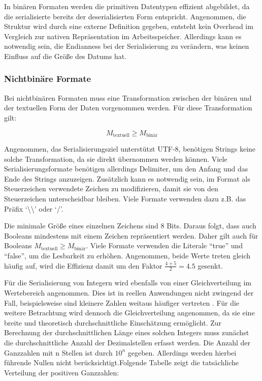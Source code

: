 \documentclass[ngerman]{seminarvorlage}
\begin{document}
In binären Formaten werden die primitiven Datentypen effizient abgebildet, da die serialisierte bereits der deserialisierten Form entspricht. Angenommen, die Struktur wird durch eine externe Definition gegeben, entsteht kein Overhead im Vergleich zur nativen Repräsentation im Arbeitsspeicher. Allerdings kann es notwendig sein, die Endianness bei der Serialisierung zu verändern, was keinen Einfluss auf die Größe des Datums hat.

\subsubsection{Nichtbinäre Formate}

Bei nichtbinären Formaten muss eine Transformation zwischen der binären und der textuellen Form der Daten vorgenommen werden. Für diese Transformation gilt:

$$ M_{\text{textuell}} \geq M_{\text{binär}} $$

Angenommen, das Serialisierungsziel unterstützt UTF-8, benötigen Strings keine solche Transformation, da sie direkt übernommen werden können. Viele Serialisierungsformate benötigen allerdings Delimiter, um den Anfang und das Ende des Strings anzuzeigen. Zusätzlich kann es notwendig sein, im Format als Steuerzeichen verwendete Zeichen zu modifizieren, damit sie von den Steuerzeichen unterscheidbar bleiben. Viele Formate verwenden dazu z.B. das Präfix `\textbackslash\textbackslash' oder `/'.

Die minimale Größe eines einzelnen Zeichens sind 8 Bits. Daraus folgt, dass auch Booleans mindestens mit einem Zeichen repräsentiert werden. Daher gilt auch für Booleans $ M_{\text{textuell}} \geq M_{\text{binär}} $. Viele Formate verwenden die Literale ``true'' und ``false'', um die Lesbarkeit zu erhöhen. Angenommen, beide Werte treten gleich häufig auf, wird die Effizienz damit um den Faktor $\frac{4 + 5}{2} = 4.5$ gesenkt.

Für die Serialisierung von Integern wird ebenfalls von einer Gleichverteilung im Wertebereich angenommen. Dies ist in reellen Anwendungen nicht zwingend der Fall, beispielsweise sind kleinere Zahlen weitaus häufiger vertreten \cite{berger2015introduction}. Für die weitere Betrachtung wird dennoch die Gleichverteilung angenommen, da sie eine breite und theoretisch durchschnittliche Einschätzung ermöglicht. Zur Berechnung der durchschnittlichen Länge eines solchen Integers muss zunächst die durchschnittliche Anzahl der Dezimalstellen erfasst werden. Die Anzahl der Ganzzahlen mit n Stellen ist durch $10^n$ gegeben. Allerdings werden hierbei führende Nullen nicht berücksichtigt.Folgende Tabelle zeigt die tatsächliche Verteilung der positiven Ganzzahlen:
\end{document}
